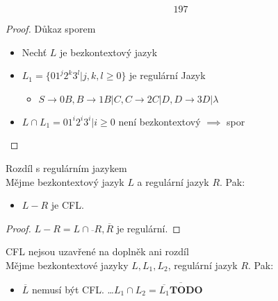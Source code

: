 \documentclass[../main.tex]{subfiles}
\begin{document}
\[197\]
\begin{proof}
    Důkaz sporem\\
    \begin{itemize}
        \item Nechť $L$ je bezkontextový jazyk
        \item $L_1 = \{01^j2^k3^l|j,k,l \geq 0\}$ je regulární Jazyk
        \begin{itemize}
            \item ${S \rightarrow 0B,B \rightarrow 1B|C,C\rightarrow 2C|D,D\rightarrow 3D|\lambda}$
        \end{itemize}
        \item $L\cap L_1 = {01^i2^i3^i|i\geq 0}$ není bezkontextový $\implies$ spor
    \end{itemize}
\end{proof}

\begin{theorem}
    Rozdíl s regulárním jazykem\\

    Mějme bezkontextový jazyk $L$ a regulární jazyk $R$. Pak:
    \begin{itemize}
        \item $L-R$ je CFL.
    \end{itemize}
    \begin{proof}
        $L - R = L \cap \overline{}{R}, \overline{R}$ je regulární.
    \end{proof}
\end{theorem}
\begin{theorem}
    CFL nejsou uzavřené na doplněk ani rozdíl\\
    
    Mějme bezkontextové jazyky $L,L_1,L_2$, regulární jazyk $R$. Pak:
    \begin{itemize}
        \item $\overline{L}$ nemusí být CFL. \dots $L_1 \cap L_2 = \overline{\overline{L_1} \textbf{TODO}}$
    \end{itemize}
\end{theorem}
\end{document}
